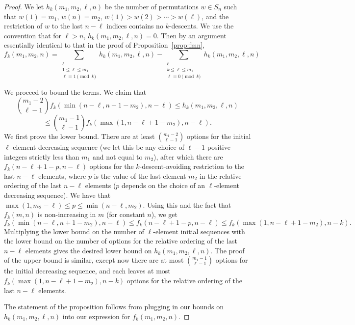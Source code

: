 \documentclass{amsart}
\theoremstyle{definition}
\begin{document}
\begin{proof}
We let $h_k(m_1,m_2,\ell,n)$ be the number of permutations $w\in S_n$ such that $w(1)=m_1$, $w(n)=m_2$, $w(1)>w(2)>\cdots>w(\ell)$, and the restriction of $w$ to the last $n-\ell$ indices contains no $k$-descents. We use the convention that for $\ell>n$, $h_k(m_1,m_2,\ell,n)=0$. Then by an argument essentially identical to that in the proof of Proposition~\ref{prop:fmn},
\[f_k(m_1,m_2,n)=\sum_{\substack{\ell\\1\leq \ell \leq m_1\\ \ell\equiv 1 \pmod{k}}} h_k\left(m_1,m_2,\ell,n\right)-\sum_{\substack{\ell\\k\leq \ell \leq m_1\\ \ell\equiv 0 \pmod{k}}} h_k\left(m_1,m_2,\ell,n\right)\]

We proceed to bound the terms. We claim that
\[\binom{m_1-2}{\ell-1}f_k\left(\min(n-\ell,n+1-m_2),n-\ell\right)\leq h_k\left(m_1,m_2,\ell,n\right)\]\[\leq \binom{m_1-1}{\ell-1}f_k\left(\max(1,n-\ell+1-m_2),n-\ell\right).\]
We first prove the lower bound. There are at least $\binom{m_1-2}{\ell-1}$ options for the initial $\ell$-element decreasing sequence (we let this be any choice of $\ell-1$ positive integers strictly less than $m_1$ and not equal to $m_2$), after which there are $f_k\left(n-\ell+1-p,n-\ell\right)$ options for the $k$-descent-avoiding restriction to the last $n-\ell$ elements, where $p$ is the value of the last element $m_2$ in the relative ordering of the last $n-\ell$ elements ($p$ depends on the choice of an $\ell$-element decreasing sequence). We have that $\max(1,m_2-\ell)\leq p\leq \min(n-\ell,m_2)$. Using this and the fact that $f_k(m,n)$ is non-increasing in $m$ (for constant $n$), we get 
\[f_k(\min(n-\ell,n+1-m_2),n-\ell)\leq f_k\left(n-\ell+1-p,n-\ell\right)\leq f_k\left(\max(1,n-\ell+1-m_2),n-k\right).\]
Multiplying the lower bound on the number of $\ell$-element initial sequences with the lower bound on the number of options for the relative ordering of the last $n-\ell$ elements gives the desired lower bound on $h_k\left(m_1,m_2,\ell,n\right)$. The proof of the upper bound is similar, except now there are at most $\binom{m_1-1}{\ell-1}$ options for the initial decreasing sequence, and each leaves at most $f_k\left(\max(1,n-\ell+1-m_2),n-k\right)$ options for the relative ordering of the last $n-\ell$ elements.

The statement of the proposition follows from plugging in our bounds on $h_k(m_1,m_2,\ell,n)$ into our expression for $f_k(m_1,m_2,n)$.
\end{proof}
\end{document}
